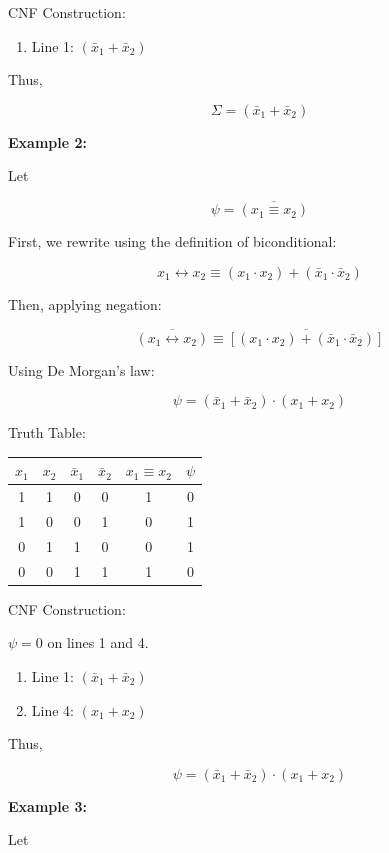 \documentclass[12pt,a4paper,openany]{article}
\begin{document}
CNF Construction:

\begin{enumerate}
\item Line 1: $(\bar{x}_1 + \bar{x}_2)$
\end{enumerate}

Thus,

\[\Sigma = (\bar{x}_1 + \bar{x}_2)\]

\textbf{Example 2:}

Let

\[\psi = \overline{(x_1 \equiv x_2)}\]

First, we rewrite using the definition of biconditional:

\[x_1 \leftrightarrow x_2 \equiv (x_1 \cdot x_2) + (\bar{x}_1 \cdot \bar{x}_2)\]

Then, applying negation:

\[
\overline{(x_1 \leftrightarrow x_2)} \equiv \overline{[(x_1 \cdot x_2) + (\bar{x}_1 \cdot \bar{x}_2)]}
\]

Using De Morgan's law:

\[
\psi = (\bar{x}_1 + \bar{x}_2) \cdot (x_1 + x_2)
\]

Truth Table:

\begin{center}
\begin{tabular}{|c|c|c|c|c|c|}
\hline
$x_1$ & $x_2$ & $\bar{x}_1$ & $\bar{x}_2$ & $x_1 \equiv x_2$ & $\psi$ \\
\hline
1 & 1 & 0 & 0 & 1 & 0 \\
\hline
1 & 0 & 0 & 1 & 0 & 1 \\
\hline
0 & 1 & 1 & 0 & 0 & 1 \\
\hline
0 & 0 & 1 & 1 & 1 & 0 \\
\hline
\end{tabular}
\end{center}

CNF Construction:

$\psi = 0$ on lines 1 and 4.

\begin{enumerate}
\item Line 1: $(\bar{x}_1 + \bar{x}_2)$
\item Line 4: $(x_1 + x_2)$
\end{enumerate}

Thus,

\[
\psi = (\bar{x}_1 + \bar{x}_2) \cdot (x_1 + x_2)
\]

\textbf{Example 3:}

Let
\end{document}
